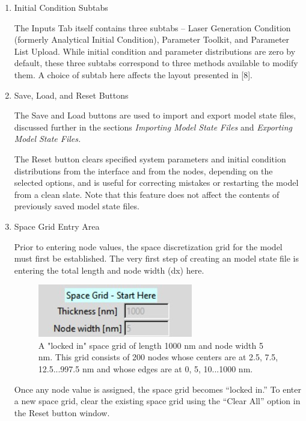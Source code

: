 \documentclass[11pt,letterpaper,titlepage]{article}
\begin{document}
			\begin{enumerate}
				\item Initial Condition Subtabs 
				\par The Inputs Tab itself contains three subtabs – Laser Generation Condition (formerly Analytical Initial Condition), Parameter Toolkit, and Parameter List Upload. While initial condition and parameter distributions are zero by default, these three subtabs correspond to three methods available to modify them. A choice of subtab here affects the layout presented in [8].
				
				\item Save, Load, and Reset Buttons
				\par The Save and Load buttons are used to import and export model state files, discussed further in the sections \textit{Importing Model State Files} and \textit{Exporting Model State Files.}
				\par The Reset button clears specified system parameters and initial condition distributions from the interface and from the nodes, depending on the selected options, and is useful for correcting mistakes or restarting the model from a clean slate. Note that this feature does not affect the contents of previously saved model state files.
				
				\item Space Grid Entry Area
				\par Prior to entering node values, the space discretization grid for the model must first be established. The very first step of creating an model state file is entering the total length and node width (dx) here.
				\begin{figure}[H]
					\label{fig:locked_in_spacegrid}
					\centering
					\includegraphics[scale=1]{"locked_in_spacegrid"}
					\caption{A "locked in" space grid of length 1000 nm and node width 5 nm. This grid consists of 200 nodes whose centers are at 2.5, 7.5, 12.5...997.5 nm and whose edges are at 0, 5, 10...1000 nm.}
				\end{figure}
				
				\par Once any node value is assigned, the space grid becomes “locked in.” To enter a new space grid, clear the existing space grid using the “Clear All” option in the Reset button window.
				

\end{enumerate}
\end{document}
